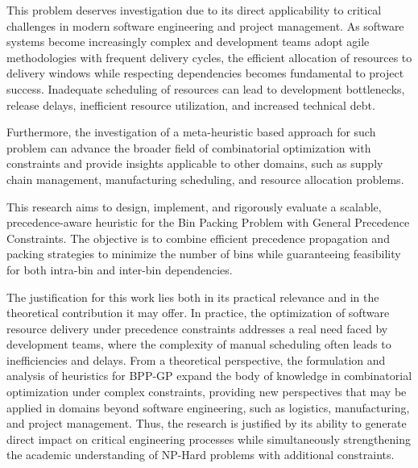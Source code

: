 \documentclass[12pt]{article}
\begin{document}
This problem deserves investigation due to its direct applicability to critical challenges in modern software engineering and project management. As software systems become increasingly complex and development teams adopt agile methodologies with frequent delivery cycles, the efficient allocation of resources to delivery windows while respecting dependencies becomes fundamental to project success. Inadequate scheduling of resources can lead to development bottlenecks, release delays, inefficient resource utilization, and increased technical debt.

Furthermore, the investigation of a meta-heuristic based approach for such problem can advance the broader field of combinatorial optimization with constraints and provide insights applicable to other domains, such as supply chain management, manufacturing scheduling, and resource allocation problems.

This research aims to design, implement, and rigorously evaluate a scalable, precedence-aware heuristic for the Bin Packing Problem with General Precedence Constraints. The objective is to combine efficient precedence propagation and packing strategies to minimize the number of bins while guaranteeing feasibility for both intra-bin and inter-bin dependencies. 

The justification for this work lies both in its practical relevance and in the theoretical contribution it may offer. In practice, the optimization of software resource delivery under precedence constraints addresses a real need faced by development teams, where the complexity of manual scheduling often leads to inefficiencies and delays. From a theoretical perspective, the formulation and analysis of heuristics for BPP-GP expand the body of knowledge in combinatorial optimization under complex constraints, providing new perspectives that may be applied in domains beyond software engineering, such as logistics, manufacturing, and project management. Thus, the research is justified by its ability to generate direct impact on critical engineering processes while simultaneously strengthening the academic understanding of NP-Hard problems with additional constraints.
\end{document}
